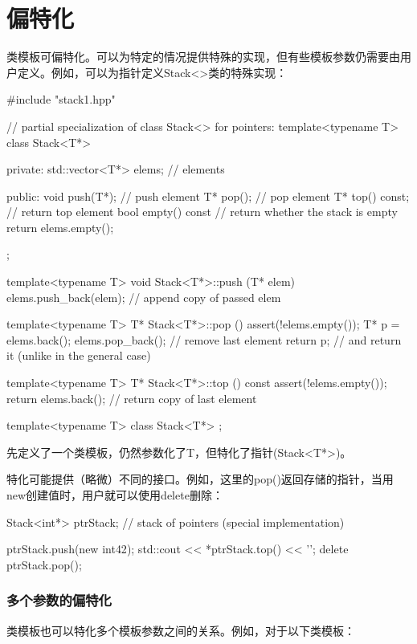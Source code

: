 \section{偏特化}

类模板可偏特化。可以为特定的情况提供特殊的实现，但有些模板参数仍需要由用户定义。例如，可以为指针定义Stack<>类的特殊实现：

\begin{cpp}
#include "stack1.hpp"

// partial specialization of class Stack<> for pointers:
template<typename T>
class Stack<T*> {
private:
	std::vector<T*> elems; // elements
	
public:
	void push(T*); // push element
	T* pop(); // pop element
	T* top() const; // return top element
	bool empty() const { // return whether the stack is empty
		return elems.empty();
	}
};

template<typename T>
void Stack<T*>::push (T* elem) {
	elems.push_back(elem); // append copy of passed elem
}

template<typename T>
T* Stack<T*>::pop () {
	assert(!elems.empty());
	T* p = elems.back();
	elems.pop_back(); // remove last element
	return p; // and return it (unlike in the general case)
}

template<typename T>
T* Stack<T*>::top () const {
	assert(!elems.empty());
	return elems.back(); // return copy of last element
}
\end{cpp}

\begin{cpp}
template<typename T>
class Stack<T*> {};
\end{cpp}

先定义了一个类模板，仍然参数化了T，但特化了指针(Stack<T*>)。

特化可能提供（略微）不同的接口。例如，这里的pop()返回存储的指针，当用new创建值时，用户就可以使用delete删除：

\begin{cpp}
Stack<int*> ptrStack; // stack of pointers (special implementation)

ptrStack.push(new int{42});
std::cout << *ptrStack.top() << '\n';
delete ptrStack.pop();
\end{cpp}

\subsubsection{多个参数的偏特化}

类模板也可以特化多个模板参数之间的关系。例如，对于以下类模板：


